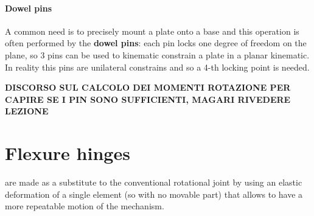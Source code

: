 	
		\paragraph{Dowel pins} A common need is to precisely mount a plate onto a base and this operation is often performed by the \textbf{dowel pins}: each pin locks one degree of freedom on the plane, so 3 pins can be used to kinematic constrain a plate in a planar kinematic. In reality this pins are unilateral constrains and so a 4-th locking point is needed.
		
		\textbf{DISCORSO SUL CALCOLO DEI MOMENTI ROTAZIONE PER CAPIRE SE I PIN SONO SUFFICIENTI, MAGARI RIVEDERE LEZIONE}
	

\section{Flexure hinges}
	 are made as a substitute to the conventional rotational joint by using an elastic deformation of a single element (so with no movable part) that allows to have a more repeatable motion of the mechanism.
	
	
	
	
	
	
	
	
	
	
	
	
	
	
	
	
	
	
	
	
	
	
	
	
	
	
	
	
	
	
	
	
	
	
	
	
	
	
	
	
	
	
	